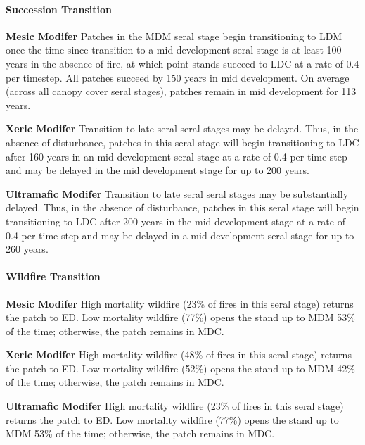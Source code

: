\paragraph{Succession Transition}
\begin{adjustwidth}{2cm}{}
\textbf{Mesic Modifer }  Patches in the MDM seral stage begin transitioning to LDM once the time since transition to a mid development seral stage is at least 100 years in the absence of fire, at which point stands succeed to LDC at a rate of 0.4 per timestep. All patches succeed by 150 years in mid development. On average (across all canopy cover seral stages), patches remain in mid development for 113 years.

\textbf{Xeric Modifer}  Transition to late seral seral stages may be delayed. Thus, in the absence of disturbance, patches in this seral stage will begin transitioning to LDC after 160 years in an mid development seral stage at a rate of 0.4 per time step and may be delayed in the mid development stage for up to 200 years. 

\textbf{Ultramafic Modifer} Transition to late seral seral stages may be substantially delayed. Thus, in the absence of disturbance, patches in this seral stage will begin transitioning to LDC after 200 years in the mid development stage at a rate of 0.4 per time step and may be delayed in a mid development seral stage for up to 260 years.

\end{adjustwidth}

\paragraph{Wildfire Transition}
\begin{adjustwidth}{2cm}{}
\textbf{Mesic Modifer } High mortality wildfire (23\% of fires in this seral stage) returns the patch to ED. Low mortality wildfire (77\%) opens the stand up to MDM 53\% of the time; otherwise, the patch remains in MDC. 

\textbf{Xeric Modifer} High mortality wildfire (48\% of fires in this seral stage) returns the patch to ED. Low mortality wildfire (52\%) opens the stand up to MDM 42\% of the time; otherwise, the patch remains in MDC.

\textbf{Ultramafic Modifer} High mortality wildfire (23\% of fires in this seral stage) returns the patch to ED. Low mortality wildfire (77\%) opens the stand up to MDM 53\% of the time; otherwise, the patch remains in MDC.

\end{adjustwidth}

